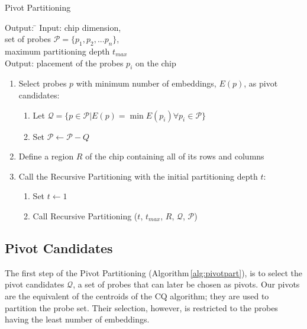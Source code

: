 \documentclass[runningheads]{llncs}
\begin{document}
\begin{algorithm}
\caption{Pivot Partitioning}
\label{alg:pivotpart}
\begin{minipage}{4.8in}

\begin{tabbing}
Output: \=									\kill
Input:  \> chip dimension,							\\
        \> set of probes $\mathcal{P} = \{p_{1}, p_{2}, ... p_{n}\}$, 		\\
        \> maximum partitioning depth $t_{max}$					\\
Output: \> placement of the probes $p_i$ on the chip
\end{tabbing}

\begin{enumerate}
\item Select probes $p$ with minimum number of embeddings, $E(p)$,
as pivot candidates:
  \begin{enumerate}
  \item Let $\mathcal{Q} = \{p \in \mathcal{P} | E(p) = \min E(p_i) \forall p_i \in \mathcal{P} \}$
  \item Set $\mathcal{P} \leftarrow \mathcal{P} - Q$
  \end{enumerate}
\item Define a region $R$ of the chip containing all of its rows and columns
\item Call the Recursive Partitioning with the initial partitioning depth $t$:
  \begin{enumerate}
  \item Set $t \leftarrow 1$
  \item Call Recursive Partitioning ($t$, $t_{max}$, $R$, $\mathcal{Q}$, $\mathcal{P}$)
  \end{enumerate}
\end{enumerate}

\end{minipage}
\end{algorithm}

\subsection{Pivot Candidates}

The first step of the Pivot Partitioning (Algorithm\,\ref{alg:pivotpart}), is to
select the pivot candidates $\mathcal{Q}$, a set of probes that can later be
chosen as pivots. Our pivots are the equivalent of the centroids of the CQ
algorithm; they are used to partition the probe set. Their
selection, however, is restricted to the probes having the least number of
embeddings.
\end{document}
